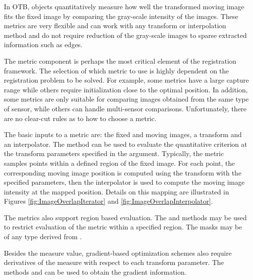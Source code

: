 %
%
%
%


In OTB,  objects quantitatively measure how well
the transformed moving image fits the fixed image by comparing the gray-scale
intensity of the images. These metrics are very flexible and can work with any
transform or interpolation method and do not require reduction of the
gray-scale images to sparse extracted information such as edges.

The metric component is perhaps the most critical element of the registration
framework. The selection of which metric to use is highly dependent on the
registration problem to be solved. For example, some metrics have a large
capture range while others require initialization close to the optimal
position.  In addition, some metrics are only suitable for comparing images 
obtained from the same type of sensor, while others can handle 
multi-sensor comparisons.
Unfortunately, there are no clear-cut rules as to how to choose a metric.


The basic inputs to a metric are: the fixed and moving images, a transform and
an interpolator. The method  can be used to evaluate the
quantitative criterion at the transform parameters specified in the argument.
Typically, the metric samples points within a defined region of the fixed
image.  For each point, the corresponding moving image position is computed
using the transform with the specified parameters, then the interpolator is
used to compute the moving image intensity at the mapped position. Details on
this mapping are illustrated in Figures \ref{fig:ImageOverlapIterator} and
\ref{fig:ImageOverlapInterpolator}. 

The metrics also support region based evaluation. The  and 
 methods may be used to restrict evaluation of the metric 
within a specified region. The masks may be of any type derived from .

Besides the measure value, gradient-based optimization schemes also require
derivatives of the measure with respect to each transform parameter. The
methods  and  can be
used to obtain the gradient information.


